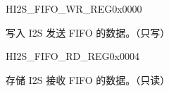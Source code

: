 \begin{register}{H}{I2S\_FIFO\_WR\_REG}{0x0000}\label{regdesc:I2SFIFOWRREG}
%
\begin{regdesc}\begin{reglist}
\item [I2S\_FIFO\_WR\_REG] 写入 I2S 发送 FIFO 的数据。（只写）
\end{reglist}\end{regdesc}
\end{register}

\begin{register}{H}{I2S\_FIFO\_RD\_REG}{0x0004}\label{regdesc:I2SFIFORDREG}
%
\begin{regdesc}\begin{reglist}
\item [I2S\_FIFO\_RD\_REG] 存储 I2S 接收 FIFO 的数据。（只读）
\end{reglist}\end{regdesc}
\end{register}

